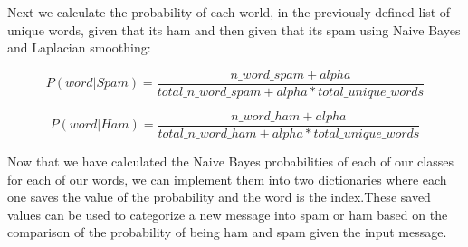  Next we calculate the probability of each world, in the previously defined list of unique words, given that its ham and then given that its spam using Naive Bayes and Laplacian smoothing:
 
 \[ P(word|Spam) = \frac{n\_word\_spam + alpha }{total\_n\_word\_spam+ alpha*total\_unique\_words} \]

\[ P(word|Ham) = \frac{n\_word\_ham + alpha }{total\_n\_word\_ham + alpha*total\_unique\_words} \] 

Now that we have calculated the Naive Bayes probabilities of each of our classes for each of our words, we can implement them into two dictionaries where each one saves the value of the probability and the word is the index.These saved values can be used to categorize a new message into spam or ham based on the comparison of the probability of being ham and spam given the input message.





